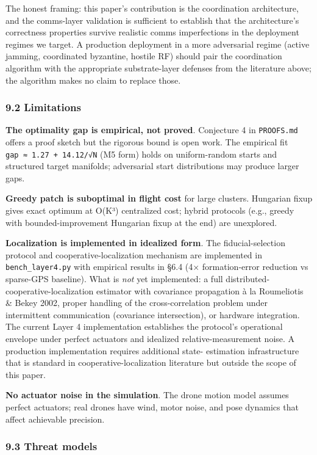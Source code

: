 The honest framing: this paper's contribution is the coordination
architecture, and the comms-layer validation is sufficient to establish
that the architecture's correctness properties survive realistic comms
imperfections in the deployment regimes we target. A production
deployment in a more adversarial regime (active jamming, coordinated
byzantine, hostile RF) should pair the coordination algorithm with the
appropriate substrate-layer defenses from the literature above; the
algorithm makes no claim to replace those.

\subsubsection{9.2 Limitations}\label{limitations}

\textbf{The optimality gap is empirical, not proved}. Conjecture 4 in
\texttt{PROOFS.md} offers a proof sketch but the rigorous bound is open
work. The empirical fit \texttt{gap\ ≈\ 1.27\ +\ 14.12/√N} (M5 form)
holds on uniform-random starts and structured target manifolds;
adversarial start distributions may produce larger gaps.

\textbf{Greedy patch is suboptimal in flight cost} for large clusters.
Hungarian fixup gives exact optimum at O(K³) centralized cost; hybrid
protocols (e.g., greedy with bounded-improvement Hungarian fixup at the
end) are unexplored.

\textbf{Localization is implemented in idealized form}. The
fiducial-selection protocol and cooperative-localization mechanism are
implemented in \texttt{bench\_layer4.py} with empirical results in §6.4
(4× formation-error reduction vs sparse-GPS baseline). What is
\emph{not} yet implemented: a full distributed-cooperative-localization
estimator with covariance propagation à la Roumeliotis \& Bekey 2002,
proper handling of the cross-correlation problem under intermittent
communication (covariance intersection), or hardware integration. The
current Layer 4 implementation establishes the protocol's operational
envelope under perfect actuators and idealized relative-measurement
noise. A production implementation requires additional state- estimation
infrastructure that is standard in cooperative-localization literature
but outside the scope of this paper.

\textbf{No actuator noise in the simulation}. The drone motion model
assumes perfect actuators; real drones have wind, motor noise, and pose
dynamics that affect achievable precision.

\subsubsection{9.3 Threat models}\label{threat-models}

